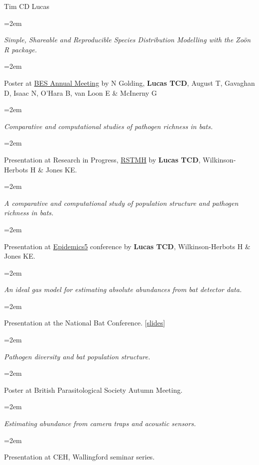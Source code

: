 \documentclass{scrartcl}
\newcommand{\Description}[1]{\hangindent=2em\hangafter=0\noindent\raggedright\footnotesize{#1}\par\normalsize\vspace{1em}} %
\newcommand{\MoreDescription}[1]{\hangindent=2em\hangafter=0\noindent\raggedright\scriptsize{#1}\par\normalsize\vspace{1em}} %
\begin{document}
\begin{cv}{Tim {\Large CD} Lucas}
\vspace{-0.5em}


\Description{\emph{Simple, Shareable and Reproducible Species Distribution Modelling with the Zo\"{o}n R package.}}\vspace{-1em}
\MoreDescription{Poster at \href{http://www.britishecologicalsociety.org/events/current_future_meetings/past-bes-annual-meetings/2015-annual-meeting/}{BES Annual Meeting} by N Golding, \textbf{Lucas TCD}, August T, Gavaghan D, Isaac N, O'Hara B, van Loon E \& McInerny G}

\vspace{-0.5em}

\Description{\emph{Comparative and computational studies of pathogen richness in bats.}}\vspace{-1em}
\MoreDescription{Presentation at Research in Progress, \href{https://rstmh.org/events/research-progress-2015}{RSTMH} by \textbf{Lucas TCD}, Wilkinson-Herbots H \& Jones KE.}

\vspace{-0.5em}

\Description{\emph{A comparative and computational study of population structure and pathogen richness in bats.}}\vspace{-1em}
\MoreDescription{Presentation at \href{http://www.epidemics.elsevier.com/}{Epidemics5} conference by \textbf{Lucas TCD}, Wilkinson-Herbots H \& Jones KE.}

\vspace{-0.5em}



\Description{\emph{An ideal gas model for estimating absolute abundances from bat detector data.}}\vspace{-1em}
\MoreDescription{Presentation at the National Bat Conference. [\href{http://www.slideshare.net/timcdlucas/tim-lucasnbc}{slides}]}

\vspace{-0.5em}

\Description{\emph{Pathogen diversity and bat population structure.}}\vspace{-1em}
\MoreDescription{Poster at British Parasitological Society Autumn Meeting.}


\vspace{-0.5em}

\Description{\emph{Estimating abundance from camera traps and acoustic sensors.}}\vspace{-1em}
\MoreDescription{Presentation at {\footnotesize CEH}, Wallingford seminar series.}



\end{cv}
\end{document}
